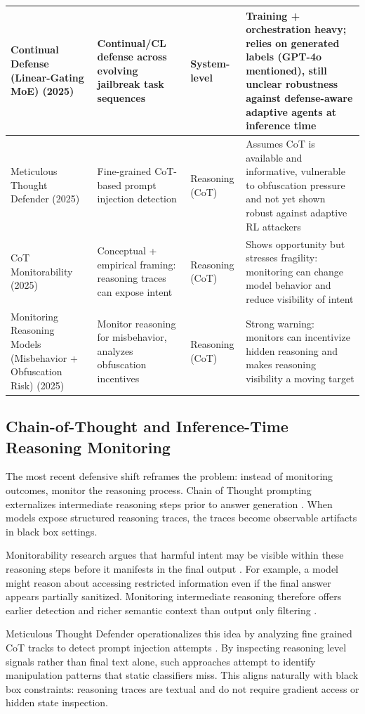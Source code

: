 \documentclass[conference]{IEEEtran}
\begin{document}
\begin{table}[!t]
{\begin{tabular}{|L{3.8cm}|L{3.3cm}|L{2.2cm}|L{6.3cm}|}
\hline
\cite{b22} Continual Defense (Linear-Gating MoE) (2025) & Continual/CL defense across evolving jailbreak task sequences & System-level & Training + orchestration heavy; relies on generated labels (GPT-4o mentioned), still unclear robustness against defense-aware adaptive agents at inference time \\
\hline
\cite{b23} Meticulous Thought Defender (2025) & Fine-grained CoT-based prompt injection detection & Reasoning (CoT) & Assumes CoT is available and informative, vulnerable to obfuscation pressure and not yet shown robust against adaptive RL attackers \\
\hline
\cite{b6} CoT Monitorability (2025) & Conceptual + empirical framing: reasoning traces can expose intent & Reasoning (CoT) & Shows opportunity but stresses fragility: monitoring can change model behavior and reduce visibility of intent \\
\hline
\cite{b7} Monitoring Reasoning Models (Misbehavior + Obfuscation Risk) (2025) & Monitor reasoning for misbehavior, analyzes obfuscation incentives & Reasoning (CoT) & Strong warning: monitors can incentivize hidden reasoning and makes reasoning visibility a moving target \\
\hline
\end{tabular}
}
\end{table}

\subsection{Chain-of-Thought and Inference-Time Reasoning Monitoring}

The most recent defensive shift reframes the problem: instead of monitoring outcomes, monitor the reasoning process. Chain of Thought prompting externalizes intermediate reasoning steps prior to answer generation \cite{b24,b25}. When models expose structured reasoning traces, the traces become observable artifacts in black box settings.

Monitorability research argues that harmful intent may be visible within these reasoning steps before it manifests in the final output \cite{b6}. For example, a model might reason about accessing restricted information even if the final answer appears partially sanitized. Monitoring intermediate reasoning therefore offers earlier detection and richer semantic context than output only filtering \cite{b6}.

Meticulous Thought Defender operationalizes this idea by analyzing fine grained CoT tracks to detect prompt injection attempts \cite{b23}. By inspecting reasoning level signals rather than final text alone, such approaches attempt to identify manipulation patterns that static classifiers miss. This aligns naturally with black box constraints: reasoning traces are textual and do not require gradient access or hidden state inspection.
\end{document}
